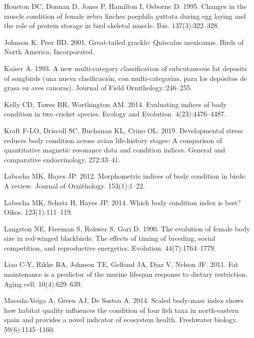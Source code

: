 \documentclass[
]{article}
\begin{document}
\leavevmode\hypertarget{ref-houston1995changes}{}%
Houston DC, Donnan D, Jones P, Hamilton I, Osborne D. 1995. Changes in
the muscle condition of female zebra finches poephila guttata during egg
laying and the role of protein storage in bird skeletal muscle. Ibis.
137(3):322--328.

\leavevmode\hypertarget{ref-johnson2001great}{}%
Johnson K, Peer BD. 2001. Great-tailed grackle: Quiscalus mexicanus.
Birds of North America, Incorporated.

\leavevmode\hypertarget{ref-kaiser1993new}{}%
Kaiser A. 1993. A new multi-category classification of subcutaneous fat
deposits of songbirds (una nueva clasificación, con multi-categorı́as,
para los depósitos de grasa en aves canoras). Journal of Field
Ornithology.:246--255.

\leavevmode\hypertarget{ref-kelly2014evaluating}{}%
Kelly CD, Tawes BR, Worthington AM. 2014. Evaluating indices of body
condition in two cricket species. Ecology and Evolution.
4(23):4476--4487.

\leavevmode\hypertarget{ref-kraft2019developmental}{}%
Kraft F-LO, Driscoll SC, Buchanan KL, Crino OL. 2019. Developmental
stress reduces body condition across avian life-history stages: A
comparison of quantitative magnetic resonance data and condition
indices. General and comparative endocrinology. 272:33--41.

\leavevmode\hypertarget{ref-labocha2012morphometric}{}%
Labocha MK, Hayes JP. 2012. Morphometric indices of body condition in
birds: A review. Journal of Ornithology. 153(1):1--22.

\leavevmode\hypertarget{ref-labocha2014body}{}%
Labocha MK, Schutz H, Hayes JP. 2014. Which body condition index is
best? Oikos. 123(1):111--119.

\leavevmode\hypertarget{ref-langston1990evolution}{}%
Langston NE, Freeman S, Rohwer S, Gori D. 1990. The evolution of female
body size in red-winged blackbirds: The effects of timing of breeding,
social competition, and reproductive energetics. Evolution.
44(7):1764--1779.

\leavevmode\hypertarget{ref-liao2011fat}{}%
Liao C-Y, Rikke BA, Johnson TE, Gelfond JA, Diaz V, Nelson JF. 2011. Fat
maintenance is a predictor of the murine lifespan response to dietary
restriction. Aging cell. 10(4):629--639.

\leavevmode\hypertarget{ref-maceda2014scaled}{}%
Maceda-Veiga A, Green AJ, De Sostoa A. 2014. Scaled body-mass index
shows how habitat quality influences the condition of four fish taxa in
north-eastern spain and provides a novel indicator of ecosystem health.
Freshwater biology. 59(6):1145--1160.
\end{document}

